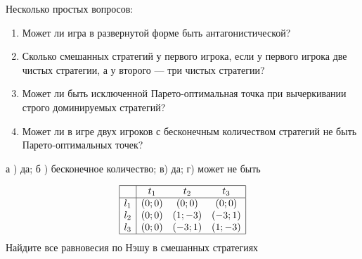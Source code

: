 \begin{problem}
 Несколько простых вопросов:\par
\begin{enumerate}
\item Может ли игра в развернутой форме быть антагонистической?\par
\item Сколько смешанных стратегий у первого игрока, если у первого игрока две чистых стратегии, а у второго --- три чистых стратегии?\par
\item  Может ли быть исключенной Парето-оптимальная точка при вычеркивании строго доминируемых стратегий?\par
\item Может ли в игре двух игроков с бесконечным количеством стратегий не быть Парето-оптимальных точек?
\end{enumerate}


\begin{sol}
а ) да; б ) бесконечное количество; в) да; г) может не быть
\end{sol}
\end{problem}







\begin{problem}

\[\begin{array}{|c|ccc|}  \hline {} & {t_{1} } & {t_{2} } & {t_{3} } \\  \hline {l_{1} } & {\left(0;0\right)} & {\left(0;0\right)} & {\left(0;0\right)} \\ {l_{2} } & {\left(0;0\right)} & {\left(1;-3\right)} & {\left(-3;1\right)} \\ {l_{3} } & {\left(0;0\right)} & {\left(-3;1\right)} & {\left(1;-3\right)} \\  \hline  \end{array}\]
Найдите все равновесия по Нэшу в смешанных стратегиях



\begin{sol}

\end{sol}
\end{problem}



